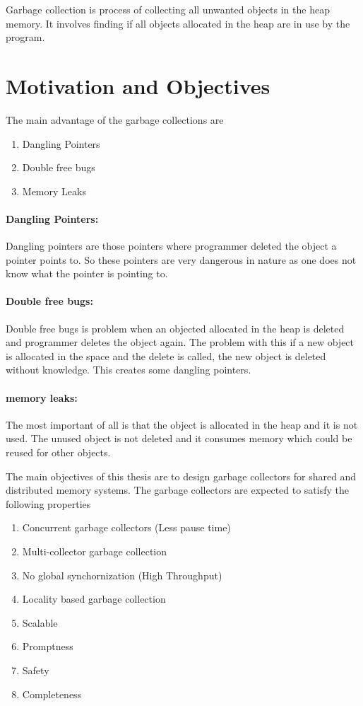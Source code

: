 Garbage collection is process of collecting all unwanted objects in the heap memory. It involves finding if all objects allocated in the heap are in use by the program.
\section{Motivation and Objectives}
\label{intro:motv}
The main advantage of the garbage collections are 
\begin{enumerate}
	\item Dangling Pointers
	\item Double free bugs
	\item Memory Leaks
\end{enumerate}
\paragraph{Dangling Pointers:}
	Dangling pointers are those pointers where programmer deleted the object a pointer points to. So these pointers are very dangerous in nature as one does not know what the pointer is pointing to.
\paragraph{Double free bugs:}
	Double free bugs is problem when an objected allocated in the heap is deleted and programmer deletes the object again. The problem with this if a new object is allocated in the space and the delete is called, the new object is deleted without knowledge. This creates some dangling pointers.
\paragraph{memory leaks:}
	The most important of all is that the object is allocated in the heap and it is not used. The unused object is not deleted and it consumes memory which could be reused for other objects.
	
The main objectives of this thesis are to design garbage collectors for shared and distributed memory systems. The garbage collectors are expected to satisfy the following properties
\begin{enumerate}
	\item Concurrent garbage collectors (Less pause time)
	\item Multi-collector garbage collection
	\item No global synchornization (High Throughput)
	\item Locality based garbage collection
	\item Scalable
	\item Promptness
	\item Safety
	\item Completeness
\end{enumerate}

